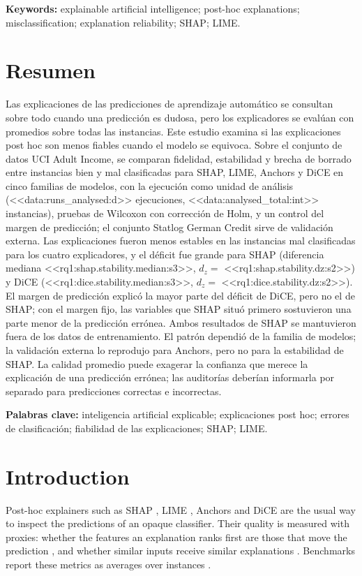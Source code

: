 \documentclass[12pt,letterpaper]{article}
\begin{document}
\noindent\textbf{Keywords:} explainable artificial intelligence; post-hoc explanations;
misclassification; explanation reliability; SHAP; LIME.

\section*{Resumen}
Las explicaciones de las predicciones de aprendizaje autom\'atico se consultan sobre todo
cuando una predicci\'on es dudosa, pero los explicadores se eval\'uan con promedios sobre
todas las instancias. Este estudio examina si las explicaciones post hoc son menos fiables
cuando el modelo se equivoca. Sobre el conjunto de datos UCI Adult Income,
se comparan fidelidad, estabilidad y brecha de borrado entre instancias bien y mal
clasificadas para SHAP, LIME, Anchors y DiCE en cinco familias de modelos, con la
ejecuci\'on como unidad de an\'alisis (<<data:runs_analysed:d>> ejecuciones,
<<data:analysed_total:int>> instancias), pruebas de Wilcoxon con correcci\'on de Holm,
y un control del margen de predicci\'on; el conjunto Statlog German Credit sirve de
validaci\'on externa.
Las explicaciones fueron menos estables en las
instancias mal clasificadas para los cuatro explicadores, y el d\'eficit fue grande para
SHAP (diferencia mediana <<rq1:shap.stability.median:s3>>,
$d_z =$ <<rq1:shap.stability.dz:s2>>) y DiCE (<<rq1:dice.stability.median:s3>>,
$d_z =$ <<rq1:dice.stability.dz:s2>>). El margen de predicci\'on explic\'o la mayor parte
del d\'eficit de DiCE, pero no el de SHAP; con el margen fijo, las variables que SHAP
situ\'o primero sostuvieron una parte menor de la predicci\'on err\'onea. Ambos resultados
de SHAP se mantuvieron fuera de los datos de entrenamiento. El patr\'on dependi\'o de la familia de modelos; la validaci\'on externa lo
reprodujo para Anchors, pero no para la estabilidad de SHAP. La calidad promedio puede exagerar la
confianza que merece la explicaci\'on de una predicci\'on err\'onea; las auditor\'ias
deber\'ian informarla por separado para predicciones correctas e incorrectas.

\noindent\textbf{Palabras clave:} inteligencia artificial explicable; explicaciones post
hoc; errores de clasificaci\'on; fiabilidad de las explicaciones; SHAP; LIME.

\section{Introduction}

Post-hoc explainers such as SHAP \cite{lundberg2017unified}, LIME \cite{ribeiro2016why},
Anchors \cite{ribeiro2018anchors} and DiCE \cite{mothilal2020dice} are the usual way to
inspect the predictions of an opaque classifier. Their quality is
measured with proxies: whether the features an explanation ranks first are those that move
the prediction \cite{bhatt2020evaluating,samek2017evaluating,hooker2019benchmark}, and
whether similar inputs receive similar explanations \cite{alvarezmelis2018robustness}.
Benchmarks report these metrics as averages over instances \cite{herrera2026framework}.
\end{document}
